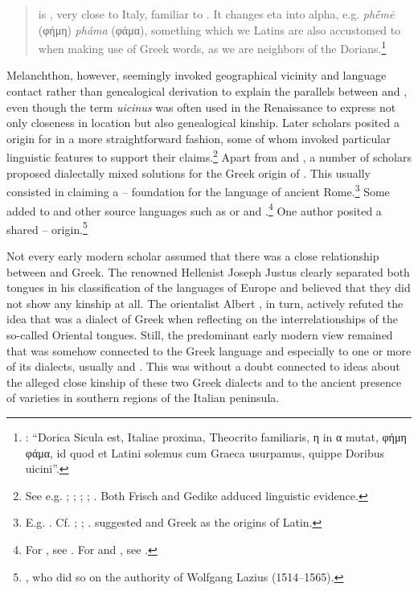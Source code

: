 \begin{quote}
 is , very close to Italy, familiar to . It changes eta into alpha, e.g. \textit{phḗmē} (φήμη) \textit{pháma} (φάμα), something which we Latins are also accustomed to when making use of Greek words, as we are neighbors of the Dorians.\footnote{\citet[a.i\textsc{\textsuperscript{v}}]{Melanchthon1518}: “Dorica Sicula est, Italiae proxima, Theocrito familiaris, η in α mutat, φήμη φάμα, id quod et Latini solemus cum Graeca usurpamus, quippe Doribus uicini”.}
\end{quote}

Melanchthon, however, seemingly invoked geographical vicinity and language contact rather than genealogical derivation to explain the parallels between  and , even though the term \textit{uicinus} was often used in the Renaissance to express not only closeness in location but also genealogical kinship. Later scholars posited a  origin for  in a more straightforward fashion, some of whom invoked particular linguistic features to support their claims.\footnote{See e.g. \citet[10]{Sylvius1531}; \citet[\textsc{i.}14]{Estienne1572}; \citet[208]{Merula1605}; \citet[1191]{[frisch]1730}; \citet[20--21]{Gedike1782}. Both Frisch and Gedike adduced linguistic evidence.} Apart from  and , a number of scholars proposed dialectally mixed solutions for the Greek origin of . This usually consisted in claiming a – foundation for the language of ancient Rome.\footnote{E.g. \citet[11--12]{Anon.1613}. Cf. \citet[304--305]{Verwey1684}; \citet[a.2\textsc{\textsuperscript{v}}, 159]{Maittaire1706}; \citet[161]{Gesner1774}. \citet[270, 379]{Casaubon1650} suggested  and  Greek as the origins of Latin.} Some added to  and  other source languages such as  or  and .\footnote{For , see \citet[a.4\textsc{\textsuperscript{r}}]{Canini1555}. For  and , see \citet[39]{Rudiger1782}.} One author posited a shared – origin.\footnote{\citet[13]{Nicolson1715}, who did so on the authority of Wolfgang Lazius (1514–1565).}

Not every early modern scholar assumed that there was a close relationship between  and Greek. The renowned Hellenist Joseph Justus \citet{Scaliger1610} clearly separated both tongues in his classification of the languages of Europe and believed that they did not show any kinship at all. The orientalist Albert \citet[109]{Schultens1738b}, in turn, actively refuted the idea that  was a dialect of Greek when reflecting on the interrelationships of the so-called Oriental tongues. Still, the predominant early modern view remained that  was somehow connected to the Greek language and especially to one or more of its dialects, usually  and . This was without a doubt connected to ideas about the alleged close kinship of these two Greek dialects and to the ancient presence of  varieties in southern regions of the Italian peninsula.

